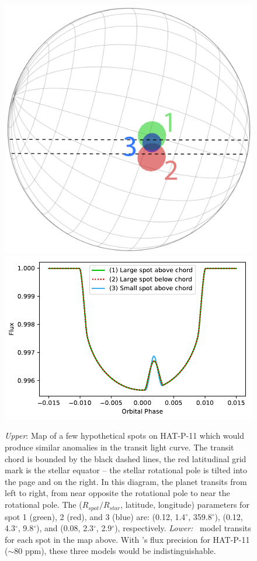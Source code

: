 \begin{figure}
\centering
\includegraphics[scale=0.2]{stsp_hat_p_11/spot_degeneracy2.pdf}
\includegraphics[scale=0.45]{stsp_hat_p_11/spot_degeneracy.pdf}
\caption{\textit{Upper}: Map of a few hypothetical spots on HAT-P-11 which would produce similar anomalies in the transit light curve.  The transit chord is bounded by the black dashed lines, the red latitudinal grid mark is the stellar equator -- the stellar rotational pole is tilted into the page and on the right. In this diagram, the planet transits from left to right, from near opposite the rotational pole to near the rotational pole. The ($R_{spot}/R_{star}$, latitude, longitude)  parameters for spot 1 (green), 2 (red), and 3 (blue) are: (0.12, 1.4$^\circ$, 359.8$^\circ$), (0.12, 4.3$^\circ$, 9.8$^\circ$), and (0.08, 2.3$^\circ$, 2.9$^\circ$), respectively. \textit{Lower:} \stsp\ model transits for each spot in the map above. With \kepler's flux precision for HAT-P-11 ($\sim 80$ ppm), these three models would be indistinguishable.}
\label{fig:rp_degeneracy}
\end{figure}

